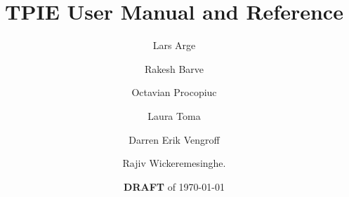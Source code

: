 

\setlength{\topmargin}{-.5in}   
\setlength{\oddsidemargin}{.1in} %
\setlength{\evensidemargin}{.1in} %
\setlength{\textwidth}{6.3in}
\setlength{\textheight}{9in}

\makeindex



\newcommand{\edition}{0.7.1}
\newcommand{\version}{0.7.1a}
\newcommand{\gxxversion}{2.8.0}





\title{TPIE User Manual and Reference}
\author{Lars Arge \and Rakesh Barve \and Octavian Procopiuc \and Laura
Toma\and 
        Darren Erik Vengroff \and Rajiv Wickeremesinghe.}
\date{{\bf DRAFT} of \today}

\maketitle

